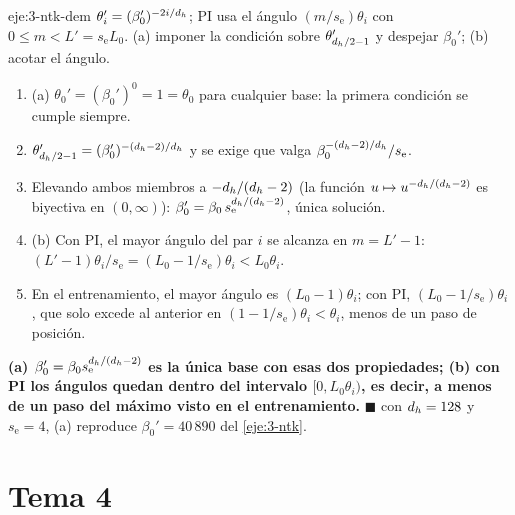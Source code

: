 \begin{solucion}{eje:3-ntk-dem}
\datos $\theta_i'=(\beta_0')^{-2i/d_{h}}$; PI usa el ángulo $(m/s_{\mathrm{e}})\theta_i$ con $0\le m<L'=s_{\mathrm{e}}L_0$.
\planteamiento (a) imponer la condición sobre $\theta'_{d_{h}/2-1}$ y despejar $\beta_0'$; (b) acotar el ángulo.
\pasos
\begin{enumerate}[label=\arabic*.]
  \item (a) $\theta_0'=(\beta_0')^{0}=1=\theta_0$ para cualquier base: la primera condición se cumple siempre.
  \item $\theta'_{d_{h}/2-1}=(\beta_0')^{-(d_{h}-2)/d_{h}}$ y se exige que valga $\beta_0^{-(d_{h}-2)/d_{h}}/s_{\mathrm{e}}$.
  \item Elevando ambos miembros a $-d_{h}/(d_{h}-2)$ (la función $u\mapsto u^{-d_{h}/(d_{h}-2)}$ es biyectiva en $(0,\infty)$): $\beta_0'=\beta_0\,s_{\mathrm{e}}^{d_{h}/(d_{h}-2)}$, única solución.
  \item (b) Con PI, el mayor ángulo del par $i$ se alcanza en $m=L'-1$: $(L'-1)\theta_i/s_{\mathrm{e}}=(L_0-1/s_{\mathrm{e}})\theta_i<L_0\theta_i$.
  \item En el entrenamiento, el mayor ángulo es $(L_0-1)\theta_i$; con PI, $(L_0-1/s_{\mathrm{e}})\theta_i$, que solo excede al anterior en $(1-1/s_{\mathrm{e}})\theta_i<\theta_i$, menos de un paso de posición.
\end{enumerate}
\resultado \textbf{(a) $\beta_0'=\beta_0s_{\mathrm{e}}^{d_{h}/(d_{h}-2)}$ es la única base con esas dos propiedades; (b) con PI los ángulos quedan dentro del intervalo $[0,L_0\theta_i)$, es decir, a menos de un paso del máximo visto en el entrenamiento.} $\blacksquare$
\comprobacion con $d_{h}=128$ y $s_{\mathrm{e}}=4$, (a) reproduce $\beta_0'=40\,890$ del \cref{eje:3-ntk}.
\end{solucion}

\section{Tema 4}

